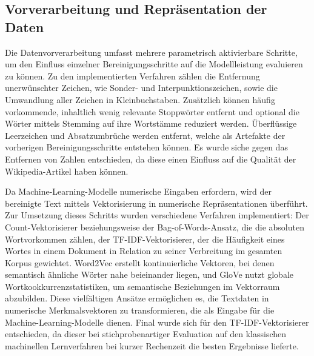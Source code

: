 \subsection{Vorverarbeitung und Repräsentation der Daten}
\label{sec:vorverarbeitung}

Die Datenvorverarbeitung umfasst mehrere parametrisch aktivierbare Schritte, um den Einfluss einzelner Bereinigungsschritte auf die Modellleistung evaluieren zu können. Zu den implementierten Verfahren zählen die Entfernung unerwünschter Zeichen, wie Sonder- und Interpunktionszeichen, sowie die Umwandlung aller Zeichen in Kleinbuchstaben. Zusätzlich können häufig vorkommende, inhaltlich wenig relevante Stoppwörter entfernt und optional die Wörter mittels Stemming auf ihre Wortstämme reduziert werden. Überflüssige Leerzeichen und Absatzumbrüche werden entfernt, welche als Artefakte der vorherigen Bereinigungsschritte entstehen können. Es wurde siche gegen das Entfernen von Zahlen entschieden, da diese einen Einfluss auf die Qualität der Wikipedia-Artikel haben können.

Da Machine-Learning-Modelle numerische Eingaben erfordern, wird der bereinigte Text mittels Vektorisierung in numerische Repräsentationen überführt. Zur Umsetzung dieses Schritts wurden verschiedene Verfahren implementiert: Der Count-Vektorisierer beziehungsweise der Bag-of-Words-Ansatz, die die absoluten Wortvorkommen zählen, der TF-IDF-Vektorisierer, der die Häufigkeit eines Wortes in einem Dokument in Relation zu seiner Verbreitung im gesamten Korpus gewichtet. Word2Vec erstellt kontinuierliche Vektoren, bei denen semantisch ähnliche Wörter nahe beieinander liegen, und GloVe nutzt globale Wortkookkurrenzstatistiken, um semantische Beziehungen im Vektorraum abzubilden. Diese vielfältigen Ansätze ermöglichen es, die Textdaten in numerische Merkmalsvektoren zu transformieren, die als Eingabe für die Machine-Learning-Modelle dienen. Final wurde sich für den TF-IDF-Vektorisierer entschieden, da dieser bei stichprobenartiger Evaluation auf den klassischen machinellen Lernverfahren bei kurzer Rechenzeit die besten Ergebnisse lieferte.

